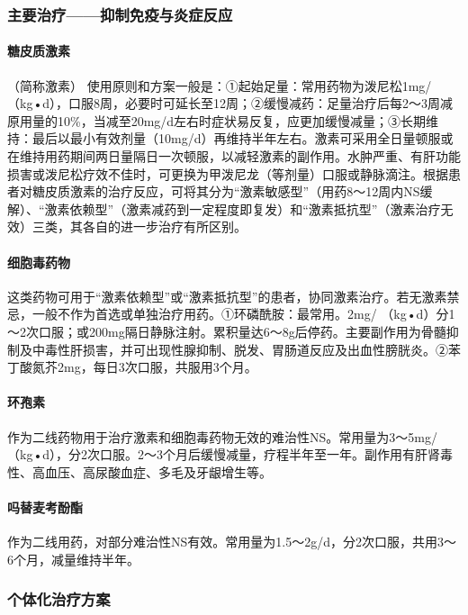 \subsubsection{主要治疗------抑制免疫与炎症反应}

\paragraph{糖皮质激素}

（简称激素）
使用原则和方案一般是：①起始足量：常用药物为泼尼松1mg/（kg•d），口服8周，必要时可延长至12周；②缓慢减药：足量治疗后每2～3周减原用量的10\%，当减至20mg/d左右时症状易反复，应更加缓慢减量；③长期维持：最后以最小有效剂量（10mg/d）再维持半年左右。激素可采用全日量顿服或在维持用药期间两日量隔日一次顿服，以减轻激素的副作用。水肿严重、有肝功能损害或泼尼松疗效不佳时，可更换为甲泼尼龙（等剂量）口服或静脉滴注。根据患者对糖皮质激素的治疗反应，可将其分为“激素敏感型”（用药8～12周内NS缓解）、“激素依赖型”（激素减药到一定程度即复发）和“激素抵抗型”（激素治疗无效）三类，其各自的进一步治疗有所区别。

\paragraph{细胞毒药物}

这类药物可用于“激素依赖型”或“激素抵抗型”的患者，协同激素治疗。若无激素禁忌，一般不作为首选或单独治疗用药。①环磷酰胺：最常用。2mg/
（kg•d）分1～2次口服；或200mg隔日静脉注射。累积量达6～8g后停药。主要副作用为骨髓抑制及中毒性肝损害，并可出现性腺抑制、脱发、胃肠道反应及出血性膀胱炎。②苯丁酸氮芥2mg，每日3次口服，共服用3个月。

\paragraph{环孢素}

作为二线药物用于治疗激素和细胞毒药物无效的难治性NS。常用量为3～5mg/（kg•d），分2次口服。2～3个月后缓慢减量，疗程半年至一年。副作用有肝肾毒性、高血压、高尿酸血症、多毛及牙龈增生等。

\paragraph{吗替麦考酚酯}

作为二线用药，对部分难治性NS有效。常用量为1.5～2g/d，分2次口服，共用3～6个月，减量维持半年。

\subsubsection{个体化治疗方案}

